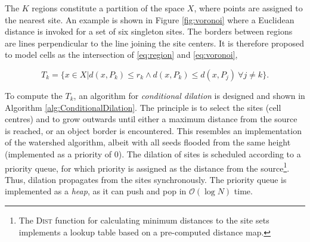 The $K$ regions constitute a partition of the space $X$, where points are assigned to the nearest site. An example is shown in Figure \ref{fig:voronoi} where a Euclidean distance is invoked for a set of six singleton sites. The borders between regions are lines perpendicular to the line joining the site centers. It is therefore proposed to model cells as the intersection of \ref{eq:region} and \ref{eq:voronoi},

\begin{equation}
T_k = \Big\{x \in X | d(x, P_k) \leq r_k \land d(x, P_k) \leq d(x, P_j) \  \forall j \neq k \Big\}.
\label{eq:conditional_dilation}
\end{equation}


To compute the $T_k$, an algorithm for \emph{conditional dilation} is designed and shown in Algorithm \ref{alg:ConditionalDilation}. The principle is to select the sites (cell centres) and to grow outwards until either a maximum distance from the source is reached, or an object border is encountered. This resembles an implementation of the watershed algorithm, albeit with all seeds flooded from the same height (implemented as a priority of $0$). The dilation of sites is scheduled according to a priority queue, for which priority is assigned as the distance from the source\footnote{The \textsc{Dist} function for calculating minimum distances to the site sets implements a lookup table based on a pre-computed distance map.}. Thus, dilation propagates from the sites synchronously. The priority queue is implemented as a \emph{heap}, as it can push and pop in $\mathcal{O}(\log N)$ time.

